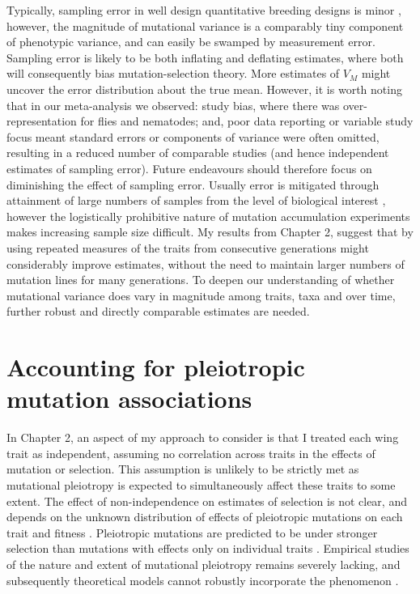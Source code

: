Typically, sampling error in well design quantitative breeding designs is minor \citep{Falc96}, however, the magnitude of mutational variance is a comparably tiny component of phenotypic variance, and can easily be swamped by measurement error. Sampling error is likely to be both inflating and deflating estimates, where both will consequently bias mutation-selection theory. More estimates of $V_M$ might uncover the error distribution about the true mean. However, it is worth noting that in our meta-analysis we observed: study bias, where there was over-representation for flies and nematodes; and, poor data reporting or variable study focus meant standard errors or components of variance were often omitted, resulting in a reduced number of comparable studies (and hence independent estimates of sampling error). Future endeavours should therefore focus on diminishing the effect of sampling error. Usually error is mitigated through attainment of large numbers of samples from the level of biological interest \citep[e.g., including more lines,][]{Lync88a}, however the logistically prohibitive nature of mutation accumulation experiments makes increasing sample size difficult. My results from Chapter 2, suggest that by using repeated measures of the traits from consecutive generations might considerably improve estimates, without the need to maintain larger numbers of mutation lines for many generations. To deepen our understanding of whether mutational variance does vary in magnitude among traits, taxa and over time, further robust and directly comparable estimates are needed. \par

\section{Accounting for pleiotropic mutation associations}
In Chapter 2, an aspect of my approach to consider is that I treated each wing trait as independent, assuming no correlation across traits in the effects of mutation or selection. This assumption is unlikely to be strictly met as mutational pleiotropy is expected to simultaneously affect these traits to some extent. The effect of non-independence on estimates of selection is not clear, and depends on the unknown distribution of effects of pleiotropic mutations on each trait and fitness \citep{Paab13}. Pleiotropic mutations are predicted to be under stronger selection than mutations with effects only on individual traits \citep{Fish30,Este06,Wagn08,McGu14}. Empirical studies of the nature and extent of mutational pleiotropy remains severely lacking, and subsequently theoretical models cannot robustly incorporate the phenomenon \citep{John05}. 

